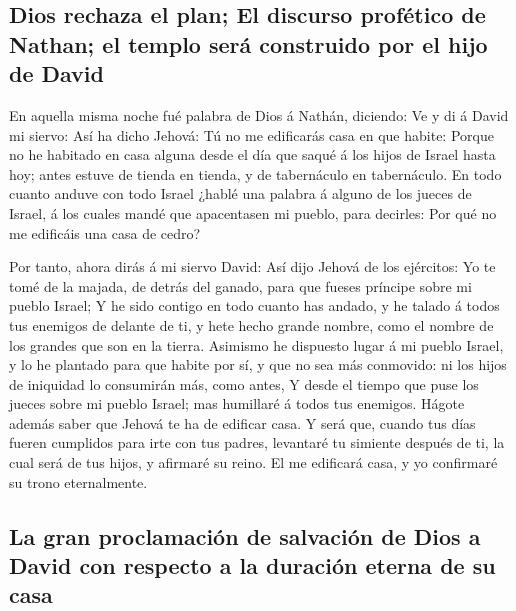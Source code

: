 \hypertarget{dios-rechaza-el-plan-el-discurso-profuxe9tico-de-nathan-el-templo-seruxe1-construido-por-el-hijo-de-david}{%
\subsection{Dios rechaza el plan; El discurso profético de Nathan; el
templo será construido por el hijo de
David}\label{dios-rechaza-el-plan-el-discurso-profuxe9tico-de-nathan-el-templo-seruxe1-construido-por-el-hijo-de-david}}

 En aquella misma noche fué palabra de Dios á Nathán,
diciendo:  Ve y di á David mi siervo: Así ha dicho Jehová:
Tú no me edificarás casa en que habite:  Porque no he
habitado en casa alguna desde el día que saqué á los hijos de Israel
hasta hoy; antes estuve de tienda en tienda, y de tabernáculo en
tabernáculo.  En todo cuanto anduve con todo Israel ¿hablé
una palabra á alguno de los jueces de Israel, á los cuales mandé que
apacentasen mi pueblo, para decirles: Por qué no me edificáis una casa
de cedro?

 Por tanto, ahora dirás á mi siervo David: Así dijo Jehová
de los ejércitos: Yo te tomé de la majada, de detrás del ganado, para
que fueses príncipe sobre mi pueblo Israel;  Y he sido
contigo en todo cuanto has andado, y he talado á todos tus enemigos de
delante de ti, y hete hecho grande nombre, como el nombre de los grandes
que son en la tierra.  Asimismo he dispuesto lugar á mi
pueblo Israel, y lo he plantado para que habite por sí, y que no sea más
conmovido: ni los hijos de iniquidad lo consumirán más, como antes,
 Y desde el tiempo que puse los jueces sobre mi pueblo
Israel; mas humillaré á todos tus enemigos. Hágote además saber que
Jehová te ha de edificar casa.  Y será que, cuando tus días
fueren cumplidos para irte con tus padres, levantaré tu simiente después
de ti, la cual será de tus hijos, y afirmaré su reino.  El
me edificará casa, y yo confirmaré su trono eternalmente.

\hypertarget{la-gran-proclamaciuxf3n-de-salvaciuxf3n-de-dios-a-david-con-respecto-a-la-duraciuxf3n-eterna-de-su-casa}{%
\subsection{La gran proclamación de salvación de Dios a David con
respecto a la duración eterna de su
casa}\label{la-gran-proclamaciuxf3n-de-salvaciuxf3n-de-dios-a-david-con-respecto-a-la-duraciuxf3n-eterna-de-su-casa}}


